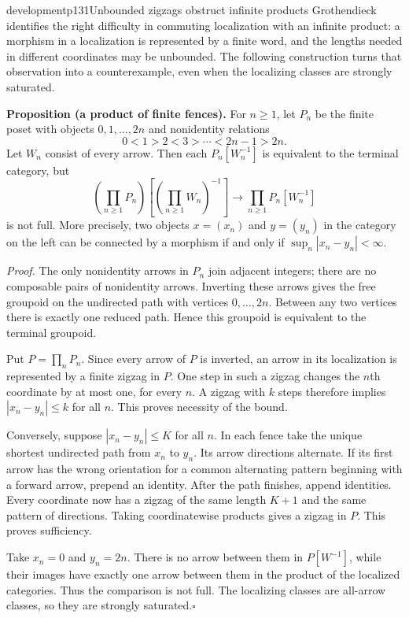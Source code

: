 \begin{dcomment}{development}{p131}{Unbounded zigzags obstruct infinite products}
Grothendieck identifies the right difficulty in commuting localization with an infinite product: a morphism in a localization is represented by a finite word, and the lengths needed in different coordinates may be unbounded. The following construction turns that observation into a counterexample, even when the localizing classes are strongly saturated.

\textbf{Proposition (a product of finite fences).}\ours
For $n\geq1$, let $P_n$ be the finite poset with objects $0,1,\ldots,2n$ and nonidentity relations
\[
 0<1>2<3>\cdots<2n-1>2n.
\]
Let $W_n$ consist of every arrow. Then each $P_n[W_n^{-1}]$ is equivalent to the terminal category, but
\[
 \left(\prod_{n\geq1}P_n\right)
 \left[\left(\prod_{n\geq1}W_n\right)^{-1}\right]
 \longrightarrow \prod_{n\geq1}P_n[W_n^{-1}]
\]
is not full. More precisely, two objects $x=(x_n)$ and $y=(y_n)$ in the category on the left can be connected by a morphism if and only if $\sup_n|x_n-y_n|<\infty$.

\textit{Proof.} The only nonidentity arrows in $P_n$ join adjacent integers; there are no composable pairs of nonidentity arrows. Inverting these arrows gives the free groupoid on the undirected path with vertices $0,\ldots,2n$. Between any two vertices there is exactly one reduced path. Hence this groupoid is equivalent to the terminal groupoid.

Put $P=\prod_nP_n$. Since every arrow of $P$ is inverted, an arrow in its localization is represented by a finite zigzag in $P$. One step in such a zigzag changes the $n$th coordinate by at most one, for every $n$. A zigzag with $k$ steps therefore implies $|x_n-y_n|\leq k$ for all $n$. This proves necessity of the bound.

Conversely, suppose $|x_n-y_n|\leq K$ for all $n$. In each fence take the unique shortest undirected path from $x_n$ to $y_n$. Its arrow directions alternate. If its first arrow has the wrong orientation for a common alternating pattern beginning with a forward arrow, prepend an identity. After the path finishes, append identities. Every coordinate now has a zigzag of the same length $K+1$ and the same pattern of directions. Taking coordinatewise products gives a zigzag in $P$. This proves sufficiency.

Take $x_n=0$ and $y_n=2n$. There is no arrow between them in $P[W^{-1}]$, while their images have exactly one arrow between them in the product of the localized categories. Thus the comparison is not full. The localizing classes are all-arrow classes, so they are strongly saturated.\hfill$\square$


\end{dcomment}

